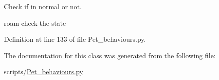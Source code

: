Check if in normal or not. 

roam check the state 

Definition at line 133 of file Pet\+\_\+behaviours.\+py.



The documentation for this class was generated from the following file\+:\begin{DoxyCompactItemize}
\item 
scripts/\hyperlink{Pet__behaviours_8py}{Pet\+\_\+behaviours.\+py}\end{DoxyCompactItemize}
